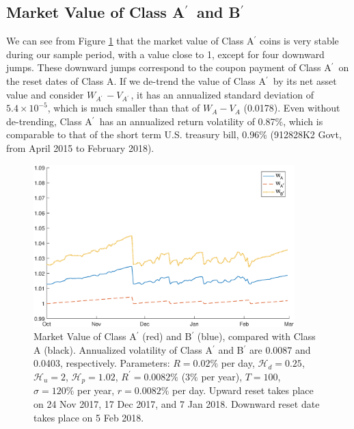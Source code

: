 \documentclass[draft, noinfoline]{ectaart}
\numberwithin{equation}{section}
\theoremstyle{plain}
\newcommand{\Ap}{A\ensuremath{^\prime}~}
\newcommand{\Bp}{B\ensuremath{^\prime}~}
\begin{document}
\subsection{\texorpdfstring{Market Value of Class \Ap and \Bp}{Lg}}

We can see from Figure \ref{fig:valAPrime} that the market value of Class A$^\prime$ coins is very stable during our sample period, with a value close to 1, except for four downward jumps. These downward jumps correspond to the coupon payment of Class \Ap on the reset dates of Class A. If we de-trend the value of Class \Ap by its net asset value and consider $W_{\Ap}-V_{\Ap}$, it has an annualized standard deviation of $5.4\times 10^{-5}$, which is much smaller than that of $W_{A}-V_{A}$ (0.0178). Even without de-trending, Class \Ap has an annualized return volatility of 0.87\%, which is comparable to that of the short term U.S. treasury bill, 0.96\% (912828K2 Govt, from April 2015 to February 2018).

\begin{figure}[!htb]
\centering
\includegraphics[width=0.9\textwidth]{WABpnoCI4.eps}
\caption{Market Value of Class A$^\prime$ (red) and B$^\prime$ (blue), compared with Class A (black). Annualized volatility of Class A$^\prime$ and B$^\prime$ are 0.0087 and 0.0403, respectively. Parameters: $R=0.02\%$ per day, $\mathcal{H}_{d}=0.25$, $\mathcal{H}_{u} =2$, $\mathcal{H}_{p}=1.02$, $R^\prime = 0.0082\%$ ($3\%$ per year), $T=100$, $\sigma= 120\%$ per year, $r=0.0082\%$ per day. Upward reset takes place on 24 Nov 2017, 17 Dec 2017, and 7 Jan 2018. Downward reset date takes place on 5 Feb 2018.}
\label{fig:valAPrime}
\end{figure}
\end{document}
